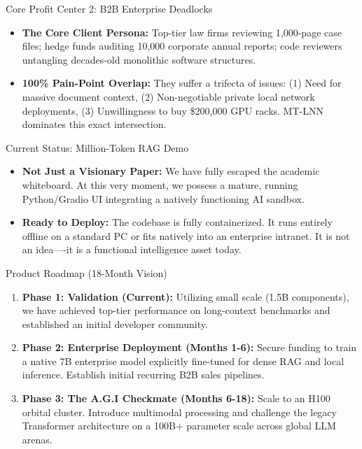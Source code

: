 ﻿\documentclass[aspectratio=169, 10pt]{beamer}
\begin{document}
\begin{frame}{Core Profit Center 2: B2B Enterprise Deadlocks}
\begin{itemize}
    \item \textbf{The Core Client Persona:} Top-tier law firms reviewing 1,000-page case files; hedge funds auditing 10,000 corporate annual reports; code reviewers untangling decades-old monolithic software structures.
    \item \textbf{100\% Pain-Point Overlap:} They suffer a trifecta of issues: (1) Need for massive document context, (2) Non-negotiable private local network deployments, (3) Unwillingness to buy \$200,000 GPU racks. MT-LNN dominates this exact intersection.
\end{itemize}
\end{frame}

\begin{frame}{Current Status: Million-Token RAG Demo}
\begin{itemize}
    \item \textbf{Not Just a Visionary Paper:} We have fully escaped the academic whiteboard. At this very moment, we possess a mature, running Python/Gradio UI integrating a natively functioning AI sandbox.
    \item \textbf{Ready to Deploy:} The codebase is fully containerized. It runs entirely offline on a standard PC or fits natively into an enterprise intranet. It is not an idea----it is a functional intelligence asset today.
\end{itemize}
\end{frame}

\begin{frame}{Product Roadmap (18-Month Vision)}
\begin{enumerate}
    \item \textbf{Phase 1: Validation (Current):} Utilizing small scale (1.5B components), we have achieved top-tier performance on long-context benchmarks and established an initial developer community.
    \vspace{0.4em}
    \item \textbf{Phase 2: Enterprise Deployment (Months 1-6):} Secure funding to train a native 7B enterprise model explicitly fine-tuned for dense RAG and local inference. Establish initial recurring B2B sales pipelines.
    \vspace{0.4em}
    \item \textbf{Phase 3: The A.G.I Checkmate (Months 6-18):} Scale to an H100 orbital cluster. Introduce multimodal processing and challenge the legacy Transformer architecture on a 100B+ parameter scale across global LLM arenas.
\end{enumerate}
\end{frame}
\end{document}
